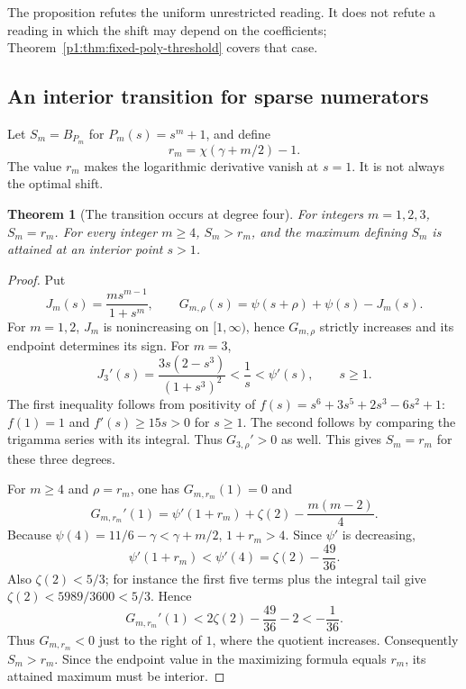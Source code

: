 \documentclass[11pt,a4paper]{article}
\newtheorem{theorem}{Theorem}[section]
\theoremstyle{definition}
\theoremstyle{remark}
\numberwithin{equation}{section}
\begin{document}
The proposition refutes the uniform unrestricted reading. It does not refute a reading in which the shift may depend on the coefficients; Theorem~\ref{p1:thm:fixed-poly-threshold} covers that case.

\subsection{An interior transition for sparse numerators}
Let $S_m=B_{P_m}$ for $P_m(s)=s^m+1$, and define
\[
 r_m=\chi(\gamma+m/2)-1.
\]
The value $r_m$ makes the logarithmic derivative vanish at $s=1$. It is not always the optimal shift.

\begin{theorem}[The transition occurs at degree four]
\label{p1:thm:sparse-transition}
For integers $m=1,2,3$, $S_m=r_m$. For every integer $m\ge4$, $S_m>r_m$, and the maximum defining $S_m$ is attained at an interior point $s>1$.
\end{theorem}
\begin{proof}
Put
\[
 J_m(s)=\frac{ms^{m-1}}{1+s^m},\qquad
 G_{m,\rho}(s)=\psi(s+\rho)+\psi(s)-J_m(s).
\]
For $m=1,2$, $J_m$ is nonincreasing on $[1,\infty)$, hence $G_{m,\rho}$ strictly increases and its endpoint determines its sign. For $m=3$,
\[
 J_3'(s)=\frac{3s(2-s^3)}{(1+s^3)^2}<\frac1s<\psi'(s),\qquad s\ge1.
\]
The first inequality follows from positivity of
$f(s)=s^6+3s^5+2s^3-6s^2+1$: $f(1)=1$ and $f'(s)\ge15s>0$ for $s\ge1$. The second follows by comparing the trigamma series with its integral. Thus $G_{3,\rho}'>0$ as well. This gives $S_m=r_m$ for these three degrees.

For $m\ge4$ and $\rho=r_m$, one has $G_{m,r_m}(1)=0$ and
\[
 G_{m,r_m}'(1)=\psi'(1+r_m)+\zeta(2)-\frac{m(m-2)}4.
\]
Because $\psi(4)=11/6-\gamma<\gamma+m/2$, $1+r_m>4$. Since $\psi'$ is decreasing,
\[
 \psi'(1+r_m)<\psi'(4)=\zeta(2)-\frac{49}{36}.
\]
Also $\zeta(2)<5/3$; for instance the first five terms plus the integral tail give $\zeta(2)<5989/3600<5/3$. Hence
\[
 G_{m,r_m}'(1)
 <2\zeta(2)-\frac{49}{36}-2<-\frac1{36}.
\]
Thus $G_{m,r_m}<0$ just to the right of $1$, where the quotient increases. Consequently $S_m>r_m$. Since the endpoint value in the maximizing formula equals $r_m$, its attained maximum must be interior.
\end{proof}
\end{document}
